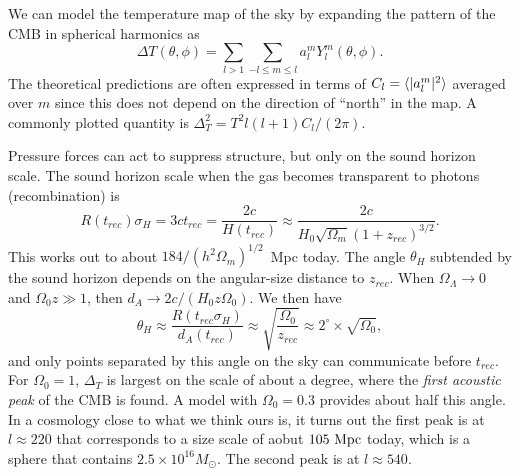 \documentclass[]{article}
\begin{document}
We can model the temperature map of the sky by expanding
the pattern of the CMB in spherical harmonics as
\begin{equation}
\Delta T(\theta, \phi) = \sum_{l>1} \sum_{-l\le m \le l} a_l^m Y_l^m(\theta, \phi).
\end{equation}
\noindent
The theoretical predictions are often expressed in terms of $C_l = \langle|a_l^m|^2\rangle$ averaged over $m$ since this does not depend on the direction of ``north''
in the map.  A commonly plotted quantity is $\Delta_T^2 = T^2 l(l+1)C_l/(2\pi)$.


Pressure forces can act to suppress structure, but only on the
sound horizon scale.  The sound horizon scale when the
gas becomes transparent to photons (recombination) is
\begin{equation}
R(t_{rec}) \sigma_H = 3 c t_{rec} = \frac{2c}{H(t_{rec})} \approx \frac{2c}{H_0\sqrt{\Omega_m}(1+z_{rec})^{3/2}}.
\end{equation}
\noindent
This works out to about $184/(h^2 \Omega_m)^{1/2}$~Mpc today.  The
angle $\theta_H$ subtended by the sound horizon depends on
the angular-size distance to $z_{rec}$.  When $\Omega_\Lambda\to0$
and $\Omega_0 z\gg1$, then $d_A\to 2c/(H_0 z \Omega_0)$. We then
have
\begin{equation}
\theta_H \approx \frac{R(t_{rec}\sigma_H)}{d_A(t_{rec})} \approx \sqrt{\frac{\Omega_0}{z_{rec}}} \approx 2^\circ \times \sqrt{\Omega_0},
\end{equation}
\noindent
and only points separated by this angle on the sky can communicate before $t_{rec}$.  For $\Omega_0=1$, $\Delta_T$ is largest on the scale of about a degree,
where the {\it first acoustic peak} of the CMB is found. A model
with $\Omega_0=0.3$ provides about half this angle. In a cosmology
close to what we think ours is, it turns out the 
first peak is at $l\approx 220$ that corresponds to a size scale of 
aobut $105~\mathrm{Mpc}$ today, which is a sphere that contains $2.5\times10^{16}M_{\odot}$.  The second peak is at $l\approx540$.
\end{document}
